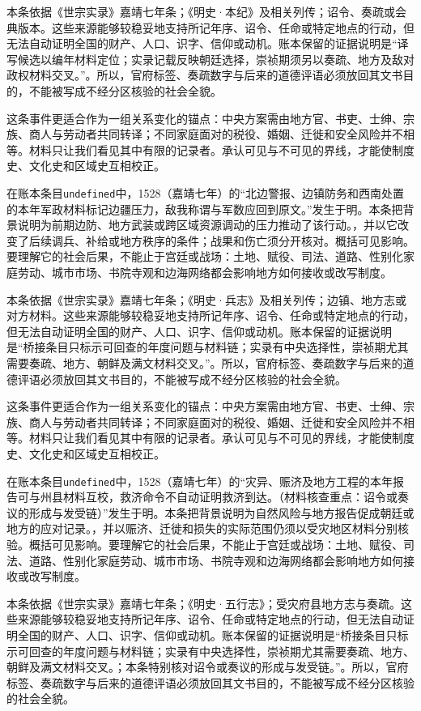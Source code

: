 本条依据《世宗实录》嘉靖七年条；《明史·本纪》及相关列传；诏令、奏疏或会典版本。这些来源能够较稳妥地支持所记年序、诏令、任命或特定地点的行动，但无法自动证明全国的财产、人口、识字、信仰或动机。账本保留的证据说明是“译写候选以编年材料定位；实录记载反映朝廷选择，崇祯期须另以奏疏、地方及敌对政权材料交叉。”。所以，官府标签、奏疏数字与后来的道德评语必须放回其文书目的，不能被写成不经分区核验的社会全貌。

这条事件更适合作为一组关系变化的锚点：中央方案需由地方官、书吏、士绅、宗族、商人与劳动者共同转译；不同家庭面对的税役、婚姻、迁徙和安全风险并不相等。材料只让我们看见其中有限的记录者。承认可见与不可见的界线，才能使制度史、文化史和区域史互相校正。

在账本条目\texttt{undefined}中，1528（嘉靖七年）的“北边警报、边镇防务和西南处置的本年军政材料标记边疆压力，敌我称谓与军数应回到原文。”发生于明。本条把背景说明为前期边防、地方武装或跨区域资源调动的压力推动了该行动。，并以它改变了后续调兵、补给或地方秩序的条件；战果和伤亡须分开核对。概括可见影响。要理解它的社会后果，不能止于宫廷或战场：土地、赋役、司法、道路、性别化家庭劳动、城市市场、书院寺观和边海网络都会影响地方如何接收或改写制度。

本条依据《世宗实录》嘉靖七年条；《明史·兵志》及相关列传；边镇、地方志或对方材料。这些来源能够较稳妥地支持所记年序、诏令、任命或特定地点的行动，但无法自动证明全国的财产、人口、识字、信仰或动机。账本保留的证据说明是“桥接条目只标示可回查的年度问题与材料链；实录有中央选择性，崇祯期尤其需要奏疏、地方、朝鲜及满文材料交叉。”。所以，官府标签、奏疏数字与后来的道德评语必须放回其文书目的，不能被写成不经分区核验的社会全貌。

这条事件更适合作为一组关系变化的锚点：中央方案需由地方官、书吏、士绅、宗族、商人与劳动者共同转译；不同家庭面对的税役、婚姻、迁徙和安全风险并不相等。材料只让我们看见其中有限的记录者。承认可见与不可见的界线，才能使制度史、文化史和区域史互相校正。

在账本条目\texttt{undefined}中，1528（嘉靖七年）的“灾异、赈济及地方工程的本年报告可与州县材料互校，救济命令不自动证明救济到达。（材料核查重点：诏令或奏议的形成与发受链）”发生于明。本条把背景说明为自然风险与地方报告促成朝廷或地方的应对记录。，并以赈济、迁徙和损失的实际范围仍须以受灾地区材料分别核验。概括可见影响。要理解它的社会后果，不能止于宫廷或战场：土地、赋役、司法、道路、性别化家庭劳动、城市市场、书院寺观和边海网络都会影响地方如何接收或改写制度。

本条依据《世宗实录》嘉靖七年条；《明史·五行志》；受灾府县地方志与奏疏。这些来源能够较稳妥地支持所记年序、诏令、任命或特定地点的行动，但无法自动证明全国的财产、人口、识字、信仰或动机。账本保留的证据说明是“桥接条目只标示可回查的年度问题与材料链；实录有中央选择性，崇祯期尤其需要奏疏、地方、朝鲜及满文材料交叉。；本条特别核对诏令或奏议的形成与发受链。”。所以，官府标签、奏疏数字与后来的道德评语必须放回其文书目的，不能被写成不经分区核验的社会全貌。

